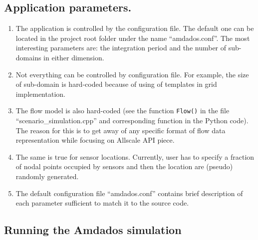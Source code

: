 \documentclass[]{article}
\begin{document}
\subsection{Application parameters.}
\begin{enumerate}
\item The application is controlled by the configuration file. The default one can be located in the project root folder under the name ``amdados.conf''. The most interesting parameters are: the integration period and the number of sub-domains in either dimension. 
\item Not everything can be controlled by configuration file. For example, the size of sub-domain is hard-coded because of using of templates in grid implementation.
\item The flow model is also hard-coded (see the function \texttt{Flow()} in the file ``scenario\_simulation.cpp'' and corresponding function in the Python code). The reason for this is to get away of any specific format of flow data representation while focusing on Allscale API piece.
\item The same is true for sensor locations. Currently, user has to specify a fraction of nodal points occupied by sensors and then the location are (pseudo) randomly generated.
\item The default configuration file ``amdados.conf'' contains brief description of each parameter sufficient to match it to the source code.
\end{enumerate}

\subsection{Running the Amdados simulation}
\end{document}
